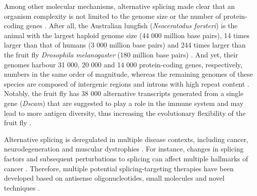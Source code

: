 Among other molecular mechanisms, alternative splicing made clear that an organism complexity is not limited to the genome size or the number of protein-coding genes \cite{lee:2015tt}. After all, the Australian lungfish (\emph{Neoceratodus forsteri}) is the animal with the largest haploid genome size (44 000 million base pairs), 14 times larger than that of humans (3 000 million base pairs) and 244 times larger than the fruit fly \emph{Drosophila melanogaster} (180 million base pairs) \cite{meyer:2021vn,adams:2000tj,myers:2000wk}. And yet, their genomes harbour 31 000, 20 000 and 14 000 protein-coding genes, respectively, numbers in the same order of magnitude, whereas the remaining genomes of these species are composed of intergenic regions and introns with high repeat content \cite{meyer:2021vn,adams:2000tj,myers:2000wk}. Notably, the fruit fly has 38 000 alternative transcripts generated from a single gene (\emph{Dscam}) that are suggested to play a role in the immune system and may lead to more antigen diversity, thus increasing the evolutionary flexibility of the fruit fly  \cite{schmucker:2000wf}.



Alternative splicing is deregulated in multiple disease contexts, including cancer, neurodegeneration and muscular dystrophies \cite{gallego-paez:2017wc,montes:2019ww}. For instance, changes in splicing factors and subsequent  perturbations to splicing can affect multiple hallmarks of cancer \cite{zhang:2021wn}. Therefore, multiple potential splicing-targeting therapies have been developed based on antisense oligonucleotides, small molecules and novel techniques \cite{montes:2019ww}.



